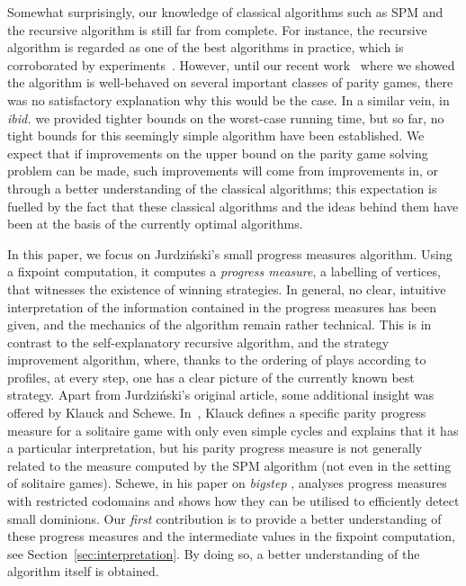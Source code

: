 \documentclass{eptcs}
\begin{document}
Somewhat surprisingly, our knowledge of classical algorithms such
as SPM and the recursive algorithm is still far from complete. For
instance, the recursive algorithm is regarded as one of the best
algorithms in practice, which is corroborated by experiments~\cite{FL:09}.
However, until our recent work~\cite{GW:13} where we showed the
algorithm is well-behaved on several important classes of parity
games, there was no satisfactory explanation why this would be the
case. In a similar vein, in \emph{ibid.} we provided tighter bounds
on the worst-case running time, but so far, no tight bounds for
this seemingly simple algorithm have been established.  We expect
that if improvements on the upper bound on the parity game solving
problem can be made, such improvements will come from improvements
in, or through a better understanding of the classical algorithms;
this expectation is fuelled by the fact that these classical
algorithms and the ideas behind them have been at the basis of the
currently optimal algorithms.\medskip

In this paper, we focus on Jurdzi\'nski's
small progress measures algorithm. Using a fixpoint computation,
it computes a \emph{progress measure}, a labelling of vertices,
that witnesses the existence of winning strategies.   In general, no clear,
intuitive interpretation of the information contained in the progress
measures has been given, and the mechanics of the algorithm remain rather
technical.  This is in contrast to the self-explanatory
recursive algorithm, and the strategy improvement algorithm, where,
thanks to the ordering of plays according to profiles, at every step,
one has a clear picture of the currently known best strategy. Apart
from Jurdzi{\'n}ski's original article, some additional insight was
offered by Klauck and Schewe.  In~\cite{2001automata},
Klauck defines a specific parity progress measure for a solitaire game with
only even simple cycles and explains that it has a particular interpretation,
but his parity progress measure is not generally related to the measure
computed by the SPM algorithm (not even in the setting of solitaire games).
Schewe, in his paper on
\emph{bigstep} \cite{Sch:07}, analyses progress measures with restricted
codomains and shows how they can be utilised to efficiently detect small dominions.
Our \emph{first} contribution  is to provide a better understanding of
these progress measures and the intermediate values in the fixpoint
computation, see Section~\ref{sec:interpretation}.  By doing so,
a better understanding of the algorithm itself is obtained.
\end{document}
